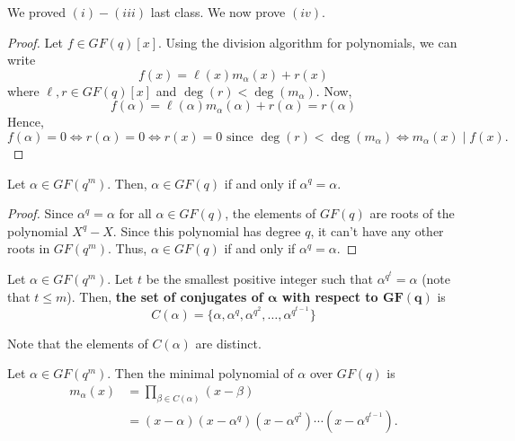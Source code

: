 We proved $ (i)-(iii) $ last class. We now prove $ (iv) $.
\begin{proof}
    Let $ f\in GF(q)[x] $. Using the division algorithm for polynomials,
    we can write
    \[ f(x)=\ell(x)m_\alpha(x)+r(x) \]
    where $ \ell,r\in GF(q)[x] $ and $ \deg(r)<\deg(m_\alpha) $. Now,
    \[ f(\alpha)=\ell(\alpha)m_\alpha(\alpha)+r(\alpha)=r(\alpha) \]
    Hence,
    \[ f(\alpha)=0\iff r(\alpha)=0\iff r(x)=0 \text{ since }\deg(r)<\deg(m_\alpha)\iff
        m_\alpha(x)\mid f(x). \]
\end{proof}

\begin{thmbox}
    \begin{theorem}
        Let $ \alpha\in GF(q^m) $. Then, $ \alpha\in GF(q) $ if and only if
        $ \alpha^q=\alpha $.
    \end{theorem}
\end{thmbox}

\begin{proof}
    Since $ \alpha^q=\alpha $ for all $ \alpha\in GF(q) $, the elements of $ GF(q) $
    are roots of the polynomial $ X^q-X $. Since this polynomial has degree $ q $,
    it can't have any other roots in $ GF(q^m) $. Thus, $ \alpha\in GF(q) $
    if and only if $ \alpha^q=\alpha $.
\end{proof}

\begin{defbox}
    \begin{definition}
        Let $ \alpha\in GF(q^m) $. Let $ t $ be the smallest positive integer such that
        $ \alpha^{q^t}=\alpha $ (note that $ t\leqslant m $). Then,
        \textbf{the set of conjugates of $ \bm{\alpha} $ with respect to $ \bm{GF(q)} $} is
        \[ C(\alpha)=\{\alpha,\alpha^q,\alpha^{q^2},\ldots,\alpha^{q^{t-1}}\} \]

        Note that the elements of $ C(\alpha) $ are distinct.
    \end{definition}
\end{defbox}

\begin{thmbox}
    \begin{theorem}
        Let $ \alpha\in GF(q^m) $. Then the minimal polynomial of $ \alpha $ over
        $ GF(q) $ is
        \begin{align*}
            m_\alpha(x)
             & =\prod_{\beta\in C(\alpha)}(x-\beta)                               \\
             & =(x-\alpha)(x-\alpha^q)(x-\alpha^{q^2})\cdots(x-\alpha^{q^{t-1}}).
        \end{align*}
    \end{theorem}
\end{thmbox}

